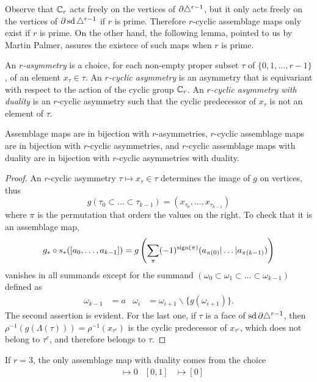 Observe that $\mathbb{C}_r$ acts freely on the vertices of $\partial \triangle^{r-1}$, but it only acts freely on the vertices of $\partial \operatorname{sd}\triangle^{r-1}$ if $r$ is prime. Therefore $r$-cyclic assemblage maps only exist if $r$ is prime. On the other hand, the following lemma, pointed to us by Martin Palmer, assures the existece of such maps when $r$ is prime.
\begin{definition}
	An \emph{$r$-asymmetry} is a choice, for each non-empty proper subset $\tau$ of $\{0,1,\ldots,r-1\}$, of an element $x_\tau\in \tau$. An \emph{$r$-cyclic asymmetry} is an asymmetry that is equivariant with respect to the action of the cyclic group $\mathbb{C}_r$. An \emph{$r$-cyclic asymmetry with duality} is an $r$-cyclic asymmetry such that the cyclic predecessor of $x_\tau$ is not an element of $\tau$.
\end{definition}
\begin{lemma}\label{lemma:asymmetry}
	 Assemblage maps are in bijection with $r$-asymmetries, $r$-cyclic assemblage maps are in bijection with $r$-cyclic asymmetries, and $r$-cyclic assemblage maps with duality are in bijection with $r$-cyclic asymmetries with duality.
\end{lemma}
\begin{proof}
	An $r$-cyclic asymmetry $\tau\mapsto x_{\tau}\in \tau$ determines the image of $g$ on vertices, thus
	\[
		g(\tau_0\subset\ldots\subset\tau_{k-1}) = (x_{\tau_0},\ldots,x_{\tau_{k-1}})
	\]
	where $\pi$ is the permutation that orders the values on the right. To check that it is an assemblage map,
	\[
	g_*\circ s_*([a_0,\ldots,a_{k-1}]) = g\left(\sum_{\pi} (-1)^{\operatorname{sign}(\pi)} (a_{\pi(0)}|\ldots|a_{\pi(k-1)})\right)
	\]
	vanishes in all summands except for the summand $(\omega_0\subset \omega_1\subset \ldots\subset \omega_{k-1})$ defined as
	\begin{align*}
		\omega_{k-1} &= a
		&
		\omega_{i} &= \omega_{i+1}\smallsetminus \{g(\omega_{i+1})\}.
	\end{align*}
	The second assertion is evident. For the last one, if $\tau$ is a face of $\operatorname{sd} \partial \triangle^{r-1}$, then $\rho^{-1}(g(\Lambda(\tau))) = \rho^{-1}(x_{\tau^c})$ is the cyclic predecessor of $x_{\tau^c}$, which does not belong to $\tau^c$, and therefore belongs to $\tau$.
	\end{proof}
\begin{example}
If $r=3$, the only assemblage map with duality comes from the choice
\begin{align*}
	[0]&\mapsto 0 & [0,1]&\mapsto [0]
\end{align*}
\end{example}

